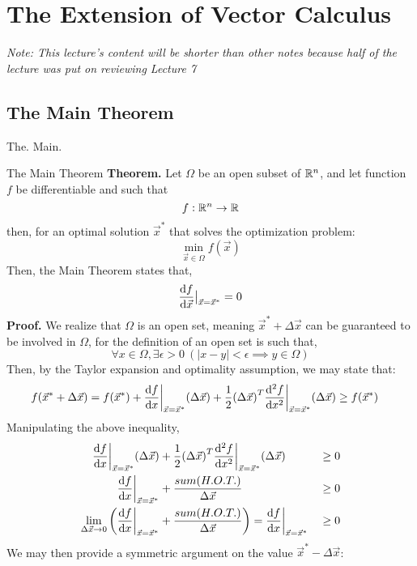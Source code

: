 \chapter{The Extension of Vector Calculus}
\textit{Note: This lecture's content will be shorter than other notes because half of the lecture was put on reviewing Lecture 7}

\section{The Main Theorem}
The. Main. 
\begin{ln-theorem}{The Main Theorem}{}
    \textbf{Theorem.} Let $\Omega$ be an open subset of $\mathbb{R}^n$, and let function $f$ be differentiable and such that
    \[
        f : \mathbb{R}^n \rightarrow \mathbb{R}
    \]
    then, for an optimal solution $\vec{x}^*$ that solves the optimization problem:
    \[
        \min_{\vec{x} \in \Omega} f(\vec{x})
    \]
    Then, the Main Theorem states that,
    \[
        \dv{f}{\vec{x}} \big|_{\vec{x} = \vec{x}^*} = 0
    \]
    \tcblower
    \textbf{Proof.} 
    We realize that $\Omega$ is an open set, meaning $\vec{x}^* + \Delta \vec{x}$ can be guaranteed to be involved in $\Omega$, for the definition of an open set is such that,
    \[\forall x \in \Omega, \exists \epsilon > 0 \ (|x - y| < \epsilon \implies y \in \Omega)\]
    Then, by the Taylor expansion and optimality assumption, we may state that:
    \begin{align*}
        f(\vec{x}^* + \Delta \vec{x}) &= f(\vec{x}^*) + \dv{f}{x} \bigg|_{\vec{x} = \vec{x}^*} (\Delta \vec{x}) + \frac{1}{2} {(\Delta \vec{x})}^T \dv[2]{f}{x} \bigg|_{\vec{x} = \vec{x}^*} (\Delta \vec{x}) \geq f(\vec{x}^*)
    \end{align*}
    Manipulating the above inequality,
    \begin{align*}
        \dv{f}{x} \bigg|_{\vec{x} = \vec{x}^*} (\Delta \vec{x}) &+ \frac{1}{2} {(\Delta \vec{x})}^T \dv[2]{f}{x} \bigg|_{\vec{x} = \vec{x}^*} (\Delta \vec{x}) &&\geq 0 \\
        \dv{f}{x} \bigg|_{\vec{x} = \vec{x}^*} &+ \frac{sum(H.O.T.)}{\Delta \vec{x}} &&\geq 0 \\
        \lim_{\Delta \vec{x} \rightarrow 0} \bigg( \dv{f}{x} \bigg|_{\vec{x} = \vec{x}^*} &+ \frac{sum(H.O.T.)}{\Delta \vec{x}} \bigg) = \dv{f}{x} \bigg|_{\vec{x} = \vec{x}^*} &&\geq 0
    \end{align*}
    We may then provide a symmetric argument on the value $\vec{x}^* - \Delta \vec{x}$:
    \begin{align*}

\end{align*}
\end{ln-theorem}
